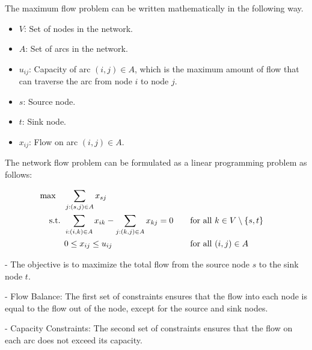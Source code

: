 The maximum flow problem can be written mathematically in the following way.\\

\begin{itemize}
\item \( V \): Set of nodes in the network.
\item \( A \): Set of arcs in the network.
\end{itemize}

\begin{itemize}
\item \( u_{ij} \): Capacity of arc \( (i, j) \in A \), which is the maximum amount of flow that can traverse the arc from node \( i \) to node \( j \).
\item \( s \): Source node.
\item \( t \): Sink node.
\end{itemize}

\begin{itemize}
\item \( x_{ij} \): Flow on arc \( (i, j) \in A \).
\end{itemize}

The network flow problem can be formulated as a linear programming problem as follows:

\begin{align*}
\max \quad & \sum_{j:(s, j) \in A} x_{sj} \\
\mbox{ s.t. }        & \sum_{i:(i, k) \in A} x_{ik} - \sum_{j:(k, j) \in A} x_{kj} = 0 &&\quad \mbox{for all } k \in V \setminus \{s, t\} \\
& 0 \leq x_{ij} \leq u_{ij} &&\quad \mbox{for all } (i, j) \in A
\end{align*}

- The objective is to maximize the total flow from the source node \( s \) to the sink node \( t \).

- Flow Balance: The first set of constraints ensures that the flow into each node is equal to the flow out of the node, except for the source and sink nodes.

- Capacity Constraints: The second set of constraints ensures that the flow on each arc does not exceed its capacity.

